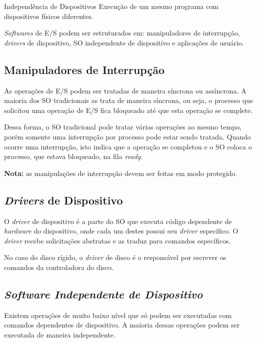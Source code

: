 \begin{definicao}{Independência de Dispositivos}
  Execução de um mesmo programa com dispositivos físicos diferentes.
\end{definicao}

\textit{Softwares} de E/S podem ser estruturados em: manipuladores de interrupção, \textit{drivers} de dispositivo, SO independente de dispositivo e aplicações de usuário.





\subsection{Manipuladores de Interrupção}
As operações de E/S podem ser tratadas de maneira síncrona ou assíncrona. A maioria dos SO tradicionais as trata de maneira síncrona, ou seja, o processo que solicitou uma operação de E/S fica bloqueado até que esta operação se complete.

Dessa forma, o SO tradicional pode tratar várias operações ao mesmo tempo, porém somente uma interrupção por processo pode estar sendo tratada. Quando ocorre uma interrupção, isto indica que a operação se completou e o SO coloca o processo, que estava bloqueado, na fila \textit{ready}.

\textbf{Nota:} as manipulações de interrupção devem ser feitas em modo protegido.




\subsection{\textit{Drivers} de Dispositivo}
O \textit{driver} de dispositivo é a parte do SO que executa código dependente de \textit{hardware} do dispositivo, onde cada um destes possui seu \textit{driver} específico. O \textit{driver} recebe solicitações abstratas e as traduz para comandos específicos.

No caso do disco rígido, o \textit{driver} de disco é o responsável por escrever os comandos da controladora do disco.




\subsection{\textit{Software Independente de Dispositivo}}
Existem operações de muito baixo nível que só podem ser executadas com comandos dependentes de dispositivo. A maioria dessas operações podem ser executada de maneira independente.

